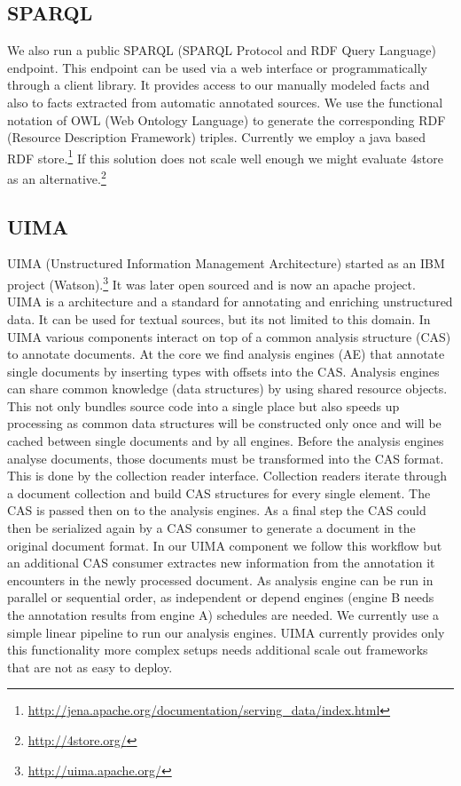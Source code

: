 \documentclass[12pt, draft]{article}
\begin{document}
\subsection{SPARQL}

We also run a public SPARQL (SPARQL Protocol and RDF Query Language) endpoint.
This endpoint can be used via a web interface or programmatically through
a client library.  It provides access to our manually modeled facts
and also to facts extracted from automatic annotated sources.
We use the functional notation of OWL (Web Ontology Language) to generate
the corresponding RDF (Resource Description Framework) triples.
Currently we employ a java based RDF store.\footnote{\url{http://jena.apache.org/documentation/serving_data/index.html}}
If this solution does not scale well enough we might evaluate
4store as an alternative.\footnote{\url{http://4store.org/}}

\subsection{UIMA}

UIMA (Unstructured Information Management Architecture) started as an
 IBM project (Watson).\footnote{\url{http://uima.apache.org/}}
It was later open sourced and is now an apache project.
UIMA is a architecture and a standard for annotating and enriching unstructured data.
It can be used for textual sources, but its not limited to this domain.
In UIMA various components interact on top of a common analysis structure (CAS)
to annotate documents. At the core we find analysis engines (AE) that
annotate single documents by inserting types with offsets into the CAS.
Analysis engines can share common knowledge (data structures) by
using shared resource objects. This not only bundles
source code into a single place but also speeds up processing as
common data structures will be constructed only once and will be cached
between single documents and by all engines.
Before the analysis engines analyse documents, those documents
must be transformed into the CAS format.
This is done by the collection reader interface. Collection readers
iterate through a document collection and build CAS structures
for every single element. The CAS is passed then on to the analysis engines.
As a final step the CAS could then be serialized again
by a CAS consumer to generate a document in the original document format.
In our UIMA component we follow this workflow but an additional CAS consumer
extractes new information from the annotation it encounters
in the newly processed document.  As analysis engine can be run in
parallel or sequential order, as independent or
depend engines (engine B needs the annotation results from engine A)
schedules are needed. We currently use a simple linear pipeline to
run our analysis engines. UIMA currently provides only this functionality
more complex setups needs additional scale out frameworks that are
not as easy to deploy.
\end{document}
